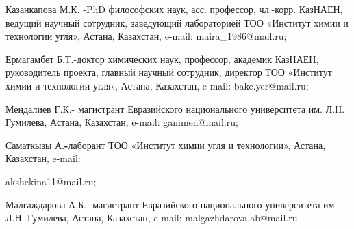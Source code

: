 \begin{noparindent}
Казанкапова М.К. -PhD философских наук, асс. профессор, чл.-корр.
КазНАЕН, ведущий научный сотрудник, заведующий лабораторией ТОО
«Институт химии и технологии угля», Астана, Казахстан, e-mail:
maira\_1986@mail.ru;

Ермагамбет Б.Т.-доктор химических наук, профессор, академик КазНАЕН,
руководитель проекта, главный научный сотрудник, директор ТОО «Институт
химии и технологии угля», Астана, Казахстан, e-mail: bake.yer@mail.ru;

Мендалиев Г.К.- магистрант Евразийского национального университета им.
Л.Н. Гумилева, Астана, Казахстан, e-mail: ganimen@mail.ru;

Саматкызы А.{\bfseries -}лаборант ТОО «Институт химии угля и технологии»,
Астана, Казахстан, e-mail:

akshekina11@mail.ru;

Малгаждарова А.Б.- магистрант Евразийского национального университета
им. Л.Н. Гумилева, Астана, Казахстан, e-mail: malgazhdarova.ab@mail.ru
\end{noparindent}
